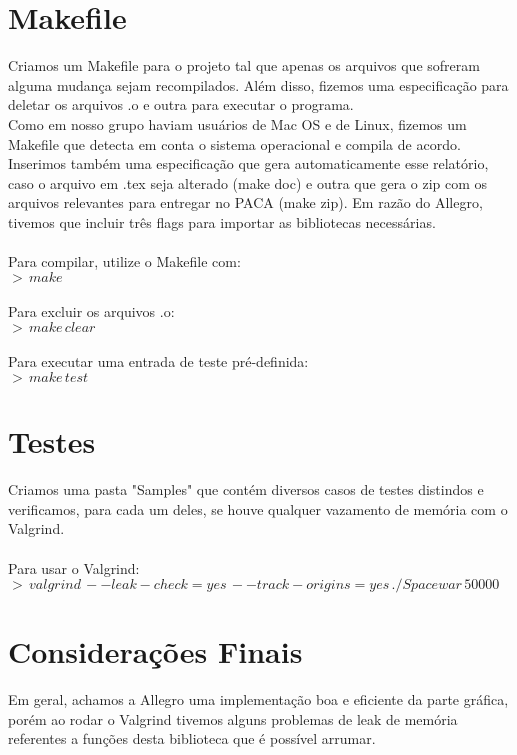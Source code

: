 \documentclass{article}
\begin{document}
\section{Makefile}
Criamos um Makefile para o projeto tal que apenas os arquivos que sofreram alguma mudança sejam recompilados. Além disso, fizemos uma especificação para deletar os arquivos .o e outra para executar o programa. \\
Como em nosso grupo haviam usuários de Mac OS e de Linux, fizemos um Makefile que detecta em conta o sistema operacional e compila de acordo.
Inserimos também uma especificação que gera automaticamente esse relatório, caso o arquivo em .tex seja alterado (make doc) e outra que gera o zip com os arquivos relevantes para entregar no PACA (make zip).
Em razão do Allegro, tivemos que incluir três flags para importar as bibliotecas necessárias. \\ \\
Para compilar, utilize o Makefile com:
\\
\indent $>\,make$ \\ \\
Para excluir os arquivos .o:
\\
\indent $>\,make\,clear$ \\ \\
Para executar uma entrada de teste pré-definida:
\\
\indent $>\,make\,test$


\section{Testes}
Criamos uma pasta "Samples" que contém diversos casos de testes distindos e verificamos, para cada um deles, se houve qualquer vazamento de memória com o Valgrind. \\ \\
Para usar o Valgrind:
\\
\indent $>\,valgrind\,--leak-check=yes\,--track-origins=yes\,./Spacewar\,50000$

\section{Considerações Finais}
Em geral, achamos a Allegro uma implementação boa e eficiente da parte gráfica, porém ao rodar o Valgrind tivemos alguns problemas de leak de memória referentes a
funções desta biblioteca que é possível arrumar.
\end{document}

